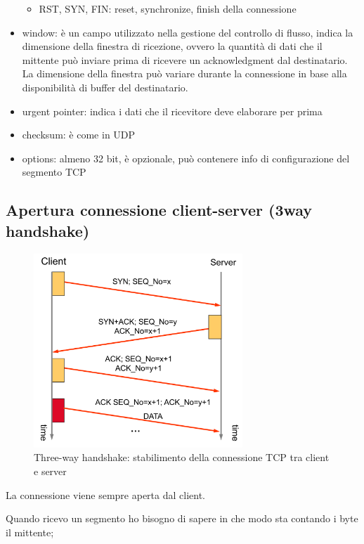 \begin{itemize}
\begin{itemize}
        \item RST, SYN, FIN: reset, synchronize, finish della connessione 
        \end{itemize}
    \item window: è un campo utilizzato nella gestione del controllo di flusso, indica la dimensione della finestra di ricezione, ovvero la quantità di dati che il mittente può inviare prima di ricevere un acknowledgment dal destinatario. La dimensione della finestra può variare durante la connessione in base alla disponibilità di buffer del destinatario.
    \item urgent pointer: indica i dati che il ricevitore deve elaborare per prima
    \item checksum: è come in UDP
    \item options: almeno 32 bit, è opzionale, può contenere info di configurazione del segmento TCP 
\end{itemize}


\subsection{Apertura connessione client-server (3way handshake)}
 
\begin{figure}[h!]
    \centering
    \includegraphics[width=0.7\textwidth]{images/three_w_hs1.png}
    \caption{Three-way handshake: stabilimento della connessione TCP tra client e server}
    \label{fig:threewayhandshake}
\end{figure}

La connessione viene sempre aperta dal client.

Quando ricevo un segmento ho bisogno di sapere in che modo sta contando i byte il mittente; 

